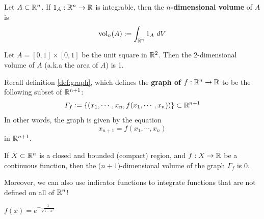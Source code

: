 
    \begin{definition}
    Let $A \subset \mathbb{R}^n$.  If $1_A : \mathbb{R}^n \to \mathbb{R}$ is integrable, then the $n$\textbf{-dimensional volume} of $A$ is $$\textnormal{vol}_n(A) := \int_{\mathbb{R}^n} 1_A \ dV$$
    \end{definition}

    \begin{example}
        Let $A = [0,1] \times [0,1]$ be the unit square  in $\mathbb{R}^2$.  Then the 2-dimensional volume of $A$ (a.k.a the area of $A$) is 1.
    \end{example}

    \begin{example}
        Recall definition \ref{def:graph}, which defines the \textbf{graph of $f : \mathbb{R}^n \to \mathbb{R}$} to be the following subset of $\mathbb{R}^{n+1}$:        
$$\Gamma_f := \{(x_1,\cdots, x_n,f(x_1, \cdots, x_n)) \} \subset \mathbb{R}^{n+1}$$ 
In other words, the graph is given by the equation $$x_{n+1} = f(x_1, \cdots, x_n)$$ in $\mathbb{R}^{n+1}$.

\begin{theorem}\label{thm:graphvolume0}
If $X \subset \mathbb{R}^n$ is a closed and bounded (compact) region, and $f : X \to \mathbb{R}$ be a continuous function, then the ($n+1$)-dimensional volume of the graph $\Gamma_f$ is 0.
\end{theorem}


    \end{example}

    Moreover, we can also use indicator functions to integrate functions that are not defined on all of $\mathbb{R}^n$!  

    \begin{example}
        $f(x) = e^{-\frac{1}{\sqrt{1-x^2}}}$
    \end{example}

